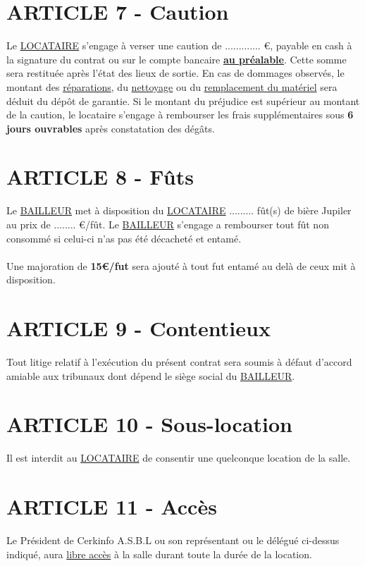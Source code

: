 \documentclass{article}
\begin{document}
\newpage

\section*{ARTICLE 7 - Caution}
Le \underline{LOCATAIRE} s’engage à verser une caution de ............. €, payable en cash à la signature du contrat ou sur le compte bancaire \textbf{\underline{au préalable}}. Cette somme sera restituée après l’état des lieux de sortie. En cas de dommages observés, le montant des \underline{réparations}, du \underline{nettoyage} ou du \underline{remplacement du matériel} sera déduit du dépôt de garantie. Si le montant du préjudice est supérieur au montant de la caution, le locataire s’engage à rembourser les frais supplémentaires sous \textbf{6 jours ouvrables} après constatation des dégâts.

\section*{ARTICLE 8 - Fûts}
Le \underline{BAILLEUR} met à disposition du \underline{LOCATAIRE} ......... fût(s) de bière Jupiler au prix de ........ €/fût. Le \underline{BAILLEUR} s'engage a rembourser tout fût non consommé si celui-ci n'as pas été décacheté et entamé.\\\\
Une majoration de \textbf{15€/fut} sera ajouté à tout fut entamé au delà de ceux mit à disposition.

\section*{ARTICLE 9 - Contentieux}
Tout litige relatif à l’exécution du présent contrat sera soumis à défaut d’accord amiable aux tribunaux dont dépend le siège social du \underline{BAILLEUR}.

\section*{ARTICLE 10 - Sous-location}
Il est interdit au \underline{LOCATAIRE} de consentir une quelconque location de la salle.

\section*{ARTICLE 11 - Accès}
Le Président de Cerkinfo A.S.B.L ou son représentant ou le délégué ci-dessus indiqué, aura \underline{libre accès} à la salle durant toute la durée de la location.
\end{document}
